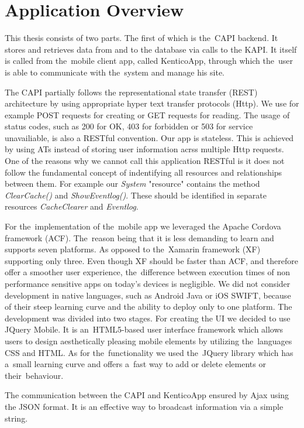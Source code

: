 \section{Application Overview}
This thesis consists of two parts. The first of which is the~CAPI backend. It stores and retrieves data from and to the database via calls to the KAPI. It itself is called from the~mobile client app, called KenticoApp, through which the~user is able to communicate with the~system and manage his site.
  


The CAPI partially follows the representational state transfer (REST) architecture by using appropriate hyper text transfer protocols (Http). We use for example POST requests for creating or GET requests for reading. The usage of status codes, such as 200 for OK, 403 for forbidden or 503 for service unavailiable, is also a RESTful convention. Our app is stateless. This is achieved by using ATs instead of storing user information acrss multiple Http requests. One of the reasons why we cannot call this application RESTful is it does not follow the fundamental concept of indentifying all resources and relationships between them. For example our \textit{System} "resource" contains the method \textit{ClearCache()} and \textit{ShowEventlog()}. These should be identified in separate resources \textit{CacheClearer} and \textit{Eventlog}.

For the~implementation of the~mobile app we leveraged the Apache Cordova framework (ACF). The~reason being that it is less demanding to learn and supports seven platforms. As opposed to the~Xamarin framework (XF) supporting only three. Even though XF should be faster than ACF, and therefore offer a smoother user experience, the~difference between execution times of non performance sensitive apps on today's devices is negligible. We did not consider development in native languages, such as Android Java or iOS SWIFT, because of their steep learning curve and the ability to deploy only to one platform. The development was divided into two stages. For creating the UI  we decided to use JQuery Mobile. It is an~HTML5-based user interface framework which allows users to design aesthetically pleasing mobile elements by utilizing the~languages CSS and HTML. As for the~functionality we used the~JQuery library which has a~small learning curve and offers a~fast way to add or delete elements or their~behaviour. 

The communication between the CAPI and KenticoApp ensured by Ajax using the JSON format. It is an effective way to broadcast information via a simple string.

